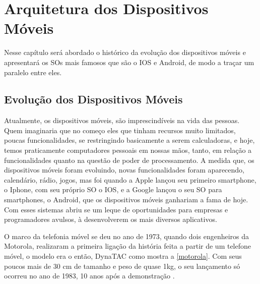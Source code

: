 \chapter{\textbf{Arquitetura dos Dispositivos Móveis}}
\label{c_cap3}


Nesse  capítulo será abordado o  histórico da evolução dos dispositivos móveis e apresentará os \ac{SO}s mais famosos que são o IOS e Android, de modo a traçar um paralelo entre eles.

\section{Evolução dos Dispositivos Móveis}
Atualmente, os dispositivos móveis, são imprescindíveis na vida das pessoas. Quem imaginaria que no começo eles que tinham recursos muito limitados, poucas funcionalidades, se restringindo basicamente a serem calculadoras, e hoje, temos praticamente computadores pessoais em nossas mãos, tanto, em relação a funcionalidades quanto na questão de poder de processamento. A medida que, os dispositivos móveis foram evoluindo, novas funcionalidades foram aparecendo, calendário, rádio, jogos, mas foi quando a Apple lançou seu primeiro smartphone, o Iphone, com seu próprio \ac{SO} o IOS, e a Google lançou o seu \ac{SO} para smartphones, o Android, que os dispositivos móveis ganhariam a fama de hoje. Com esses sistemas abriu se um leque de oportunidades para empresas e programadores avulsos, à desenvolverem os mais diversos aplicativos.

O marco da telefonia móvel se deu no ano de 1973, quando dois engenheiros da Motorola, realizaram a primeira ligação da história feita a partir de um telefone móvel, o modelo era o então, DynaTAC como mostra a \autoref{motorola}. Com seus poucos mais  de 30 cm de tamanho e peso de quase 1kg, o seu lançamento só ocorreu no ano de 1983, 10 anos após a demonstração \cite{historia_mobile}.

